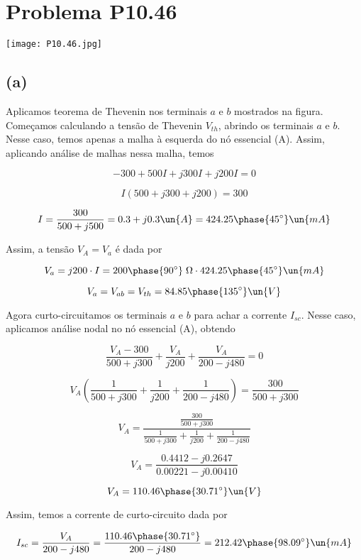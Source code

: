 
\section*{Problema P10.46}

\renewcommand*\thesection{10.46}

\begin{center}
    \texttt{[image: P10.46.jpg]}
\end{center}

\subsection*{(a)}

Aplicamos teorema de Thevenin nos terminais $a$ e $b$ mostrados na figura. \\
Começamos calculando a tensão de Thevenin $V_{th}$, abrindo os terminais $a$ e $b$. Nesse caso, temos apenas a malha à esquerda
do nó essencial (A). Assim, aplicando análise de malhas nessa malha, temos

\[ -300 + 500I + j300I + j200I = 0 \]

\[ I(500 + j300 + j200) = 300 \]

\[ I = \frac{300}{500 + j500} = 0.3 + j0.3 \un{A} = 424.25\phase{45^{\circ}} \un{mA}\]

Assim, a tensão $V_A = V_a$ é dada por   

\[ V_a = j200 \cdot I = 200\phase{90^{\circ}} \;\Omega \cdot 424.25\phase{45^{\circ}} \un{mA}\]

\[ V_a = V_{ab} = V_{th} = 84.85\phase{135^{\circ}} \un{V}\]

Agora curto-circuitamos os terminais $a$ e $b$ para achar a corrente $I_{sc}$. Nesse caso, aplicamos análise nodal no nó
essencial (A), obtendo

\[ \frac{V_A - 300}{500 + j300} + \frac{V_A}{j200} + \frac{V_A}{200 - j480} = 0 \]

\[ V_A\left(\frac{1}{500 + j300} + \frac{1}{j200} + \frac{1}{200 - j480}\right) = \frac{300}{500 + j300} \]

\[ V_A = \frac{\frac{300}{500 + j300}}{\frac{1}{500 + j300} + \frac{1}{j200} + \frac{1}{200 - j480}} \]

\[ V_A = \frac{0.4412 - j0.2647}{0.00221 - j0.00410} \]

\[ V_A = 110.46\phase{30.71^{\circ}} \un{V} \]

Assim, temos a corrente de curto-circuito dada por

\[ I_{sc} = \frac{V_A}{200 - j480} = \frac{110.46\phase{30.71^{\circ}}}{200 - j480} = 212.42\phase{98.09^{\circ}}\un{mA} \]

